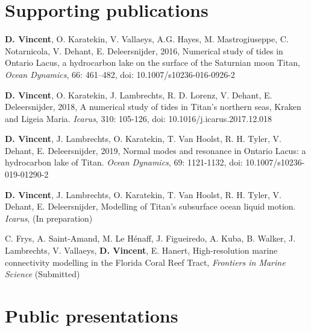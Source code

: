 \lipsum[1-12]
\clearpage

\section*{Supporting publications}


\begin{list}{}{%
\setlength{\topsep}{0pt}%
\setlength{\leftmargin}{0.23in}%
\setlength{\listparindent}{-0.23in}%
\setlength{\itemindent}{-0.23in}%
\setlength{\parsep}{\parskip}%
}%


\item \textbf{D. Vincent}, O. Karatekin, V. Vallaeys, A.G. Hayes, M. Mastrogiuseppe, C. Notarnicola, V. Dehant, E. Deleersnijder, 2016, Numerical study of tides in Ontario Lacus, a hydrocarbon lake on the surface of the Saturnian moon Titan, \textit{Ocean Dynamics}, 66: 461--482, doi: 10.1007/s10236-016-0926-2

\item \textbf{D. Vincent}, O. Karatekin, J. Lambrechts, R. D. Lorenz, V. Dehant, E. Deleersnijder, 2018, A numerical study of tides in Titan's northern seas, Kraken and Ligeia Maria. \textit{Icarus}, 310: 105-126, doi: 10.1016/j.icarus.2017.12.018


\item \textbf{D. Vincent}, J. Lambrechts, O. Karatekin, T. Van Hoolst, R. H. Tyler, V. Dehant, E. Deleersnijder, 2019, Normal modes and resonance in Ontario Lacus: a hydrocarbon lake of Titan. \textit{Ocean Dynamics}, 69: 1121-1132, doi: 10.1007/s10236-019-01290-2

\item \textbf{D. Vincent}, J. Lambrechts, O. Karatekin, T. Van Hoolst, R. H. Tyler, V. Dehant, E. Deleersnijder, Modelling of Titan's subsurface ocean liquid motion. \textit{Icarus}, (In preparation)


\item C. Frys, A. Saint-Amand, M. Le Hénaff, J. Figueiredo, A. Kuba, B. Walker, J. Lambrechts, V. Vallaeys, \textbf{D. Vincent}, E. Hanert, High-resolution marine connectivity modelling in the Florida Coral Reef Tract, \textit{Frontiers in Marine Science} (Submitted)
\end{list}

\section*{Public presentations}

